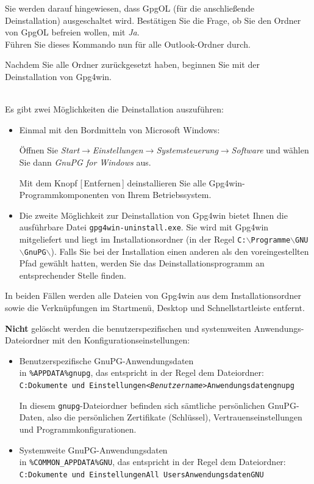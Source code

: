 \documentclass[a4paper,11pt, oneside,openright,titlepage,dvips]{scrbook}
\newcommand{\Button}[1]{[\,#1\,]}
\newcommand{\Menu}[1]{\emph{#1}}
\newcommand{\Filename}[1]{\texttt{#1}}
\begin{document}
Sie werden darauf hingewiesen, dass GpgOL (für die anschließende Deinstallation)
ausgeschaltet wird. Bestätigen Sie die Frage, ob Sie den Ordner von
GpgOL befreien wollen, mit \textit{Ja}.\\
Führen Sie dieses Kommando nun für alle Outlook-Ordner durch.

Nachdem Sie alle Ordner zurückgesetzt haben, beginnen Sie mit der Deinstallation von Gpg4win.

~\\
Es gibt zwei Möglichkeiten die Deinstallation auszuführen:

\begin{itemize}
\item Einmal mit den Bordmitteln von Microsoft Windows:

    Öffnen Sie
\Menu{Start$\rightarrow$Einstellungen$\rightarrow$Systemsteuerung$\rightarrow$Software}
und wählen Sie dann \textit{GnuPG for Windows} aus.

Mit dem Knopf \Button{Entfernen} deinstallieren Sie alle
Gpg4win-Programmkomponenten von Ihrem Betriebssystem.

\item Die zweite Möglichkeit zur Deinstallation von Gpg4win bietet
    Ihnen die ausführbare Datei \texttt{gpg4win-uninstall.exe}. 
    Sie wird mit Gpg4win mitgeliefert und
liegt im Installationsordner (in der Regel 
\Filename{C:$\backslash$Programme$\backslash$GNU$\backslash$GnuPG$\backslash$}).
Falls Sie bei der Installation einen anderen als den voreingestellten Pfad
gewählt hatten, werden Sie das Deinstallationsprogramm an entsprechender
Stelle finden.
\end{itemize}

In beiden Fällen werden alle Dateien von Gpg4win aus dem
Installationsordner sowie die Verknüpfungen im Startmenü, Desktop
und Schnellstartleiste entfernt.

\textbf{Nicht} gelöscht werden die benutzerspezifischen und
systemweiten Anwendungs-Dateiordner mit den Konfigurationseinstellungen:

\begin{itemize}
    \item Benutzerspezifische GnuPG-Anwendungsdaten\\
        in \Filename{\%APPDATA\%\back{}gnupg}, das
        entspricht in der Regel dem Dateiordner: \\
\Filename{C:\back{}Dokumente und
Einstellungen\back{}\textit{<Benutzername>}\back{}Anwendungsdaten\back{}gnupg\back{}}

        In diesem \texttt{gnupg}-Dateiordner befinden sich sämtliche
        persönlichen GnuPG-Daten,
        also die persönlichen Zertifikate (Schlüssel), Vertrauenseinstellungen und
        Programmkonfigurationen.

    \item Systemweite GnuPG-Anwendungsdaten\\
        in \Filename{\%COMMON\_APPDATA\%\back{}GNU}, das
        entspricht in der Regel dem Dateiordner: 
        \Filename{C:\back{}Dokumente und Einstellungen\back{}All
Users\back{}Anwendungsdaten\back{}GNU\back{}}

\end{itemize}
\end{document}
